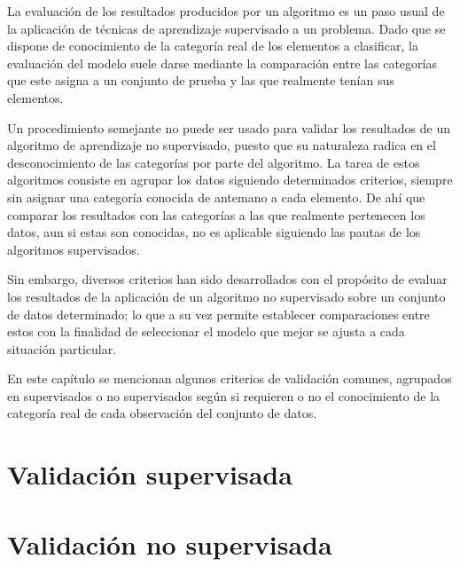 La evaluación de los resultados producidos por un algoritmo es un paso usual de la aplicación de técnicas de aprendizaje supervisado a un problema.
Dado que se dispone de conocimiento de la categoría real de los elementos a clasificar, la evaluación del modelo suele darse mediante la comparación entre las categorías que este asigna a un conjunto de prueba y las que realmente tenían sus elementos.

Un procedimiento semejante no puede ser usado para validar los resultados de un algoritmo de aprendizaje no supervisado, puesto que su naturaleza radica en el desconocimiento de las categorías por parte del algoritmo.
La tarea de estos algoritmos consiste en agrupar los datos siguiendo determinados criterios, siempre sin asignar una categoría conocida de antemano a cada elemento.
De ahí que comparar los resultados con las categorías a las que realmente pertenecen los datos, aun si estas son conocidas, no es aplicable siguiendo las pautas de los algoritmos supervisados.

Sin embargo, diversos criterios han sido desarrollados con el propósito de evaluar los resultados de la aplicación de un algoritmo no supervisado sobre un conjunto de datos determinado;
lo que a su vez permite establecer comparaciones entre estos con la finalidad de seleccionar el modelo que mejor se ajusta a cada situación particular.

En este capítulo se mencionan algunos criterios de validación comunes, agrupados en supervisados o no supervisados según si requieren o no el conocimiento de la categoría real de cada observación del conjunto de datos.

\section{Validación supervisada}\label{sec:validaciónSupervisada}


\section{Validación no supervisada}\label{sec:validaciónNoSupervisada}
